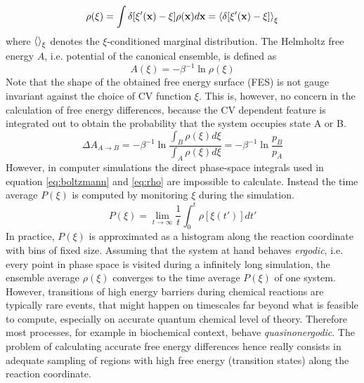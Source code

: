 \begin{equation}
  \rho(\xi)=\int \delta[\xi'(\textbf{x})-\xi]\rho(\textbf{x})d\textbf{x}=\braket{\delta [\xi'(\textbf{x})-\xi]}_\xi
  \label{eq:rho}
\end{equation}
where $\braket{}_\xi$ denotes the $\xi$-conditioned marginal distribution. The Helmholtz free energy $A$, i.e. potential of the canonical ensemble, is defined as
\begin{equation}
  A(\xi) = -\beta^{-1}\ln \rho(\xi)
  \label{eq:free energy}
\end{equation}
Note that the shape of the obtained free energy surface (FES) is not gauge invariant against the choice of CV function $\xi$. This is, however, no concern in the calculation of free energy differences, because the CV dependent feature is integrated out to obtain the probability that the system occupies state A or B.\autocite{bal2020free}
\begin{equation}
  \Delta A_{A\rightarrow B} = -\beta^{-1}\ln \frac{\int_B \rho(\xi)d\xi}{\int_A \rho(\xi)d\xi}=-\beta^{-1}\ln \frac{p_B}{p_A}
  \label{eq:free energy diff}
\end{equation}
However, in computer simulations the direct phase-space integrals used in equation \ref{eq:boltzmann} and \ref{eq:rho} are impossible to calculate.\autocite{chipot2007free} Instead the time average $P(\xi)$ is computed by monitoring $\xi$ during the simulation.
\begin{equation}
  P(\xi)=\lim_{t\rightarrow \infty}\frac{1}{t} \int_0^t \rho[\xi (t')] dt'
  \label{eq:ergodic}
\end{equation}
In practice, $P(\xi)$ is approximated as a histogram along the reaction coordinate with bins of fixed size.
Assuming that the system at hand behaves \textit{ergodic}, i.e. every point in phase space is visited during a infinitely long simulation, the ensemble average $\rho(\xi)$ converges to the time average $P(\xi)$ of one system.
However, transitions of high energy barriers during chemical reactions are typically rare events, that might happen on timescales far beyond what is feasible to compute, especially on accurate quantum chemical level of theory. Therefore most processes, for example in biochemical context, behave \textit{quasinonergodic}.
The problem of calculating accurate free energy differences hence really consists in adequate sampling of regions with high free energy (transition states) along the reaction coordinate.

